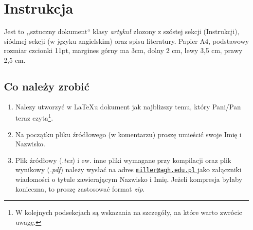 \documentclass[a4paper,11pt,fleqn]{article}
\begin{document}
\setcounter{section}{5}
\setcounter{page}{123}
 
 
\section{Instrukcja}
Jest to ,,sztuczny dokument`` klasy \textit{artykuł} złozony z szóstej sekcji (Instrukcji), siódmej sekcji
(w języku angielskim) oraz spisu literatury. Papier A4, podstawowy rozmiar czcionki 11pt, margines
górny ma 3cm, dolny 2 cm, lewy 3,5 cm, prawy 2,5 cm.
 
 
 
\subsection{Co należy zrobić}\label{conalezyzrobic}
\begin{enumerate}
\item Nalezy utworzyć w {\LaTeX}u dokument jak najblizszy temu, który Pani/Pan teraz czyta\footnote{W kolejnych podsekcjach są wskazania na szczegóły, na które warto zwrócic uwagę.}.
\item Na początku pliku źródłowego (w komentarzu) proszę umieścić swoje Imię i Nazwisko.
\item Plik źródłowy (\textit{.tex}) i ew. inne pliki wymagane przy kompilacji oraz plik wynikowy (\textit{.pdf})
należy wysłać na adres \href{mailto:miller@agh.edu.pl}{\nolinkurl{miller@agh.edu.pl} } jako załączniki wiadomości o tytule zawierającym Nazwisko i Imię. Jeżeli kompresja byłaby konieczna, to proszę zastosować
format \textit{zip}.
\end{enumerate}
 
 
 
\end{document}
